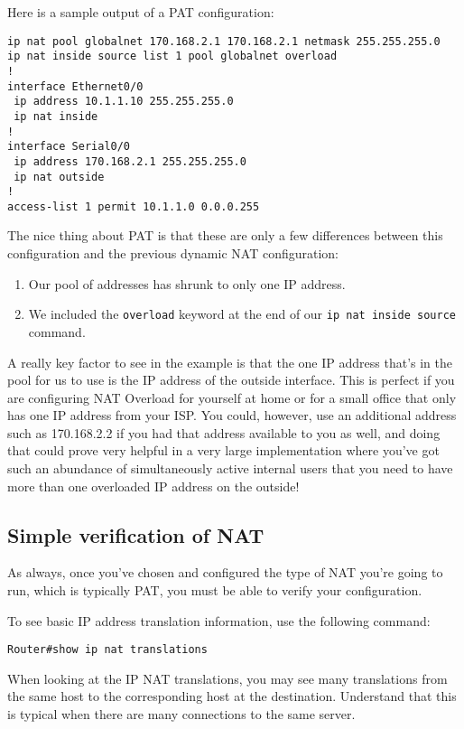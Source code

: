 Here is a sample output of a PAT configuration:

\begin{verbatim}
ip nat pool globalnet 170.168.2.1 170.168.2.1 netmask 255.255.255.0
ip nat inside source list 1 pool globalnet overload
!
interface Ethernet0/0
 ip address 10.1.1.10 255.255.255.0
 ip nat inside
!
interface Serial0/0
 ip address 170.168.2.1 255.255.255.0
 ip nat outside
!
access-list 1 permit 10.1.1.0 0.0.0.255
\end{verbatim}

The nice thing about
PAT is that these are only a few differences between this configuration
and the previous dynamic NAT configuration:

\begin{enumerate}
\tightlist
\item
  Our pool of addresses has shrunk to only one IP address.
\item
  We included the \texttt{overload} keyword at the end of our
  \texttt{ip\ nat\ inside\ source} command.
\end{enumerate}

A really key factor to see in the example is that the one IP address
that's in the pool for us to use is the IP address of the outside
interface. This is perfect if you are configuring NAT Overload for
yourself at home or for a small office that only has one IP address from
your ISP. You could, however, use an additional address such as
170.168.2.2 if you had that address available to you as well, and doing
that could prove very helpful in a very large implementation where
you've got such an abundance of simultaneously active internal users
that you need to have more than one overloaded IP address on the
outside!




\subsection{Simple verification of NAT}

As always, once you've chosen and configured the type of NAT you're
going to run, which is typically PAT, you must be able to verify your
configuration.

To see basic IP address translation information, use the following
command:

\begin{verbatim}
Router#show ip nat translations
\end{verbatim}

When looking at the IP NAT translations, you may see many translations
from the same host to the corresponding host at the destination.
Understand that this is typical when there are many connections to the
same server.

